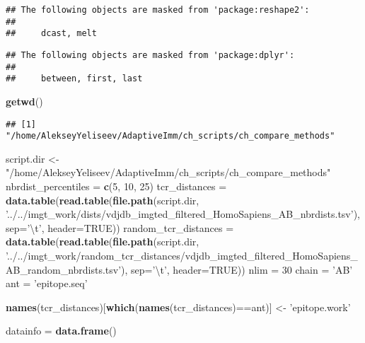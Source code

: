 \documentclass[]{article}
\newenvironment{Shaded}{\begin{snugshade}}{\end{snugshade}}
\newcommand{\KeywordTok}[1]{\textcolor[rgb]{0.13,0.29,0.53}{\textbf{{#1}}}}
\newcommand{\DataTypeTok}[1]{\textcolor[rgb]{0.13,0.29,0.53}{{#1}}}
\newcommand{\DecValTok}[1]{\textcolor[rgb]{0.00,0.00,0.81}{{#1}}}
\newcommand{\CharTok}[1]{\textcolor[rgb]{0.31,0.60,0.02}{{#1}}}
\newcommand{\StringTok}[1]{\textcolor[rgb]{0.31,0.60,0.02}{{#1}}}
\newcommand{\OtherTok}[1]{\textcolor[rgb]{0.56,0.35,0.01}{{#1}}}
\newcommand{\NormalTok}[1]{{#1}}
\begin{document}
\begin{verbatim}
## The following objects are masked from 'package:reshape2':
## 
##     dcast, melt
\end{verbatim}

\begin{verbatim}
## The following objects are masked from 'package:dplyr':
## 
##     between, first, last
\end{verbatim}

\begin{Shaded}
\begin{Highlighting}[]
\KeywordTok{getwd}\NormalTok{()}
\end{Highlighting}
\end{Shaded}

\begin{verbatim}
## [1] "/home/AlekseyYeliseev/AdaptiveImm/ch_scripts/ch_compare_methods"
\end{verbatim}

\begin{Shaded}
\begin{Highlighting}[]
\NormalTok{script.dir <-}\StringTok{ "/home/AlekseyYeliseev/AdaptiveImm/ch_scripts/ch_compare_methods"}
\NormalTok{nbrdist_percentiles =}\StringTok{ }\KeywordTok{c}\NormalTok{(}\DecValTok{5}\NormalTok{, }\DecValTok{10}\NormalTok{, }\DecValTok{25}\NormalTok{)}
\NormalTok{tcr_distances =}\StringTok{ }\KeywordTok{data.table}\NormalTok{(}\KeywordTok{read.table}\NormalTok{(}\KeywordTok{file.path}\NormalTok{(script.dir, }\StringTok{'../../imgt_work/dists/vdjdb_imgted_filtered_HomoSapiens_AB_nbrdists.tsv'}\NormalTok{), }\DataTypeTok{sep=}\StringTok{'}\CharTok{\textbackslash{}t}\StringTok{'}\NormalTok{, }\DataTypeTok{header=}\OtherTok{TRUE}\NormalTok{))}
\NormalTok{random_tcr_distances =}\StringTok{ }\KeywordTok{data.table}\NormalTok{(}\KeywordTok{read.table}\NormalTok{(}\KeywordTok{file.path}\NormalTok{(script.dir, }\StringTok{'../../imgt_work/random_tcr_distances/vdjdb_imgted_filtered_HomoSapiens_AB_random_nbrdists.tsv'}\NormalTok{), }\DataTypeTok{sep=}\StringTok{'}\CharTok{\textbackslash{}t}\StringTok{'}\NormalTok{, }\DataTypeTok{header=}\OtherTok{TRUE}\NormalTok{))}
\NormalTok{nlim =}\StringTok{ }\DecValTok{30}
\NormalTok{chain =}\StringTok{ 'AB'}
\NormalTok{ant =}\StringTok{ 'epitope.seq'}

\KeywordTok{names}\NormalTok{(tcr_distances)[}\KeywordTok{which}\NormalTok{(}\KeywordTok{names}\NormalTok{(tcr_distances)==ant)] <-}\StringTok{ 'epitope.work'}

\NormalTok{datainfo =}\StringTok{ }\KeywordTok{data.frame}\NormalTok{()}
\end{Highlighting}
\end{Shaded}
\end{document}
